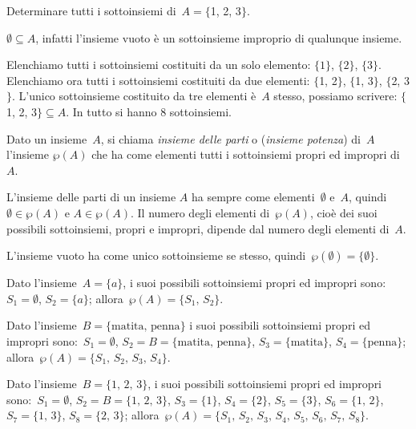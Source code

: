 \begin{exrig}
 \begin{esempio}
Determinare tutti i sottoinsiemi di~$A=\{$1, 2, 3$\}$.

$\emptyset \subseteq A$, infatti l'insieme vuoto è un
sottoinsieme improprio di qualunque insieme.

Elenchiamo tutti i sottoinsiemi costituiti da un solo elemento: $\{1\}$, $\{2\}$, $\{3\}$.
Elenchiamo ora tutti i sottoinsiemi costituiti da due elementi: $\{$1, 2$\}$, $\{$1, 3$\}$, $\{$2, 3$\}$.
L'unico sottoinsieme costituito da tre elementi è~$A$ stesso, possiamo scrivere:
$\{$1, 2, 3$\}\subseteq A$. In tutto si hanno 8 sottoinsiemi.
 \end{esempio}

\end{exrig}

\begin{definizione}
Dato un insieme~$A$, si chiama \emph{insieme delle parti} o (\emph{insieme potenza}) di~$A$ l'insieme $\wp(A)$ che ha come elementi
tutti i sottoinsiemi propri ed impropri di~$A$.
\end{definizione}

L'insieme delle parti di un insieme $A$ ha sempre come
elementi~$\emptyset $ e~$A$, quindi~$\emptyset\in\wp (A)$ e
$A\in\wp (A)$.
Il numero degli elementi di~$\wp (A)$, cioè dei suoi possibili
sottoinsiemi, propri e impropri, dipende dal numero degli elementi di~$A$.

\begin{exrig}
 \begin{esempio}
 L'insieme vuoto ha come unico sottoinsieme se stesso,
quindi~$\wp (\emptyset )=\{\emptyset \}$.
 \end{esempio}

\begin{esempio}
 Dato l'insieme~$A=\{a\}$, i suoi possibili sottoinsiemi
propri ed impropri sono:~$S_{1}=\emptyset$, $S_{2}=\{a\}$;
allora~$\wp (A)=\{S_{1}\text{, }S_{2}\}$.
 \end{esempio}

\begin{esempio}
 Dato l'insieme~$B=\{\text{matita, penna}\}$ i
suoi possibili sottoinsiemi propri ed impropri sono:~$S_{1}=\emptyset$,
$S_{2}=B=\{\text{matita, penna}\}$, $S_{3}=\{\text{matita}\}$,
$S_{4}=\{\text{penna}\}$;
allora~$\wp (A)=\{S_{1}\text{, }S_{2}\text{, }S_{3}\text{, }S_{4}\}$.
 \end{esempio}

\begin{esempio}
 Dato l'insieme~$B=\{\text{1, 2, 3}\}$, i suoi possibili
sottoinsiemi propri ed impropri sono:~$S_{1}=\emptyset$,
$S_{2}=B=\{\text{1, 2, 3}\}$, $S_{3}=\{1\}$, $S_{4}=\{2\}$, $S_{5}=\{3\}$,
$S_{6}=\{1\text{, }2\}$, $S_{7}=\{1\text{, }3\}$, $S_{8}=\{2\text{, }3\}$;
allora~$\wp (A)=\{S_{1}\text{, }S_{2}\text{, }S_{3}\text{, }S_{4}\text{, }S_{5}\text{, }S_{6}\text{, }S_{7}\text{, }S_{8}\}$.
 \end{esempio}
 \end{exrig}

